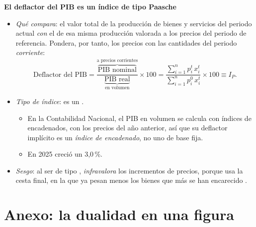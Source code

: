 \documentclass[11pt]{article}
\begin{document}
\begin{anotaciones}
\textbf{El deflactor del PIB es un índice de tipo Paasche}\\
\begin{itemize}
\item \emph{Qué compara}: el valor total de la producción de bienes y servicios del periodo actual \emph{con} el de esa misma producción valorada a los precios del periodo de referencia. Pondera, por tanto, los precios con las cantidades del periodo \emph{corriente}:
\begin{equation*}
\text{Deflactor del PIB}=\frac{\overbrace{\text{PIB nominal}}^{\text{a precios corrientes}}}{\underbrace{\text{PIB real}}_{\text{en volumen}}}\times 100=\frac{\displaystyle\sum_{i=1}^{n}p_i^t\,x_i^t}{\displaystyle\sum_{i=1}^{n}p_i^0\,x_i^t}\times 100\equiv I_P.
\end{equation*}
\item \emph{Tipo de índice}: es un .
  \begin{itemize}
  \item En la Contabilidad Nacional, el PIB en volumen se calcula con índices de  encadenados, con los precios del año anterior, así que su deflactor implícito es un \emph{índice de  encadenado}, no uno de base fija\nocite{UE2013SEC2010}.
  \item En 2025 creció un 3,0\,\%\nocite{INE2026CNA2025}.
  \end{itemize}
\item \emph{Sesgo}: al ser de tipo , \emph{infravalora} los incrementos de precios, porque usa la cesta final, en la que ya pesan menos los bienes que más se han encarecido  .
\end{itemize}
\end{anotaciones}

\clearpage
\section{Anexo: la dualidad en una figura}\label{anexo:infografia-dualidad}

\begin{infografia}[H]
\centering
\caption{La dualidad en la decisión de consumo: el primal y el dual en tres dimensiones, las cuatro funciones y las relaciones entre ellas}\label{figu:infografia-dualidad}
\end{infografia}
\end{document}
